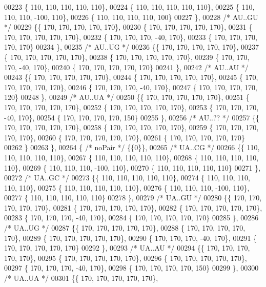 \begin{DoxyCode}
00223 \{ 110, 110, 110, 110, 110\},
00224 \{ 110, 110, 110, 110, 110\},
00225 \{ 110, 110, 110, -100, 110\},
00226 \{ 110, 110, 110, 110, 100\}
00227 \},
00228 \textcolor{comment}{/* AU..GU */}
00229 \{\{ 170, 170, 170, 170, 170\},
00230 \{ 170, 170, 170, 170, 170\},
00231 \{ 170, 170, 170, 170, 170\},
00232 \{ 170, 170, 170, -40, 170\},
00233 \{ 170, 170, 170, 170, 170\}
00234 \},
00235 \textcolor{comment}{/* AU..UG */}
00236 \{\{ 170, 170, 170, 170, 170\},
00237 \{ 170, 170, 170, 170, 170\},
00238 \{ 170, 170, 170, 170, 170\},
00239 \{ 170, 170, 170, -40, 170\},
00240 \{ 170, 170, 170, 170, 170\}
00241 \},
00242 \textcolor{comment}{/* AU..AU */}
00243 \{\{ 170, 170, 170, 170, 170\},
00244 \{ 170, 170, 170, 170, 170\},
00245 \{ 170, 170, 170, 170, 170\},
00246 \{ 170, 170, 170, -40, 170\},
00247 \{ 170, 170, 170, 170, 120\}
00248 \},
00249 \textcolor{comment}{/* AU..UA */}
00250 \{\{ 170, 170, 170, 170, 170\},
00251 \{ 170, 170, 170, 170, 170\},
00252 \{ 170, 170, 170, 170, 170\},
00253 \{ 170, 170, 170, -40, 170\},
00254 \{ 170, 170, 170, 170, 150\}
00255 \},
00256 \textcolor{comment}{/* AU..?? */}
00257 \{\{ 170, 170, 170, 170, 170\},
00258 \{ 170, 170, 170, 170, 170\},
00259 \{ 170, 170, 170, 170, 170\},
00260 \{ 170, 170, 170, 170, 170\},
00261 \{ 170, 170, 170, 170, 170\}
00262 \}
00263 \},
00264 \{ \textcolor{comment}{/* noPair */} \{\{0\}\},
00265 \textcolor{comment}{/* UA..CG */}
00266 \{\{ 110, 110, 110, 110, 110\},
00267 \{ 110, 110, 110, 110, 110\},
00268 \{ 110, 110, 110, 110, 110\},
00269 \{ 110, 110, 110, -100, 110\},
00270 \{ 110, 110, 110, 110, 110\}
00271 \},
00272 \textcolor{comment}{/* UA..GC */}
00273 \{\{ 110, 110, 110, 110, 110\},
00274 \{ 110, 110, 110, 110, 110\},
00275 \{ 110, 110, 110, 110, 110\},
00276 \{ 110, 110, 110, -100, 110\},
00277 \{ 110, 110, 110, 110, 110\}
00278 \},
00279 \textcolor{comment}{/* UA..GU */}
00280 \{\{ 170, 170, 170, 170, 170\},
00281 \{ 170, 170, 170, 170, 170\},
00282 \{ 170, 170, 170, 170, 170\},
00283 \{ 170, 170, 170, -40, 170\},
00284 \{ 170, 170, 170, 170, 170\}
00285 \},
00286 \textcolor{comment}{/* UA..UG */}
00287 \{\{ 170, 170, 170, 170, 170\},
00288 \{ 170, 170, 170, 170, 170\},
00289 \{ 170, 170, 170, 170, 170\},
00290 \{ 170, 170, 170, -40, 170\},
00291 \{ 170, 170, 170, 170, 170\}
00292 \},
00293 \textcolor{comment}{/* UA..AU */}
00294 \{\{ 170, 170, 170, 170, 170\},
00295 \{ 170, 170, 170, 170, 170\},
00296 \{ 170, 170, 170, 170, 170\},
00297 \{ 170, 170, 170, -40, 170\},
00298 \{ 170, 170, 170, 170, 150\}
00299 \},
00300 \textcolor{comment}{/* UA..UA */}
00301 \{\{ 170, 170, 170, 170, 170\},

\end{DoxyCode}
